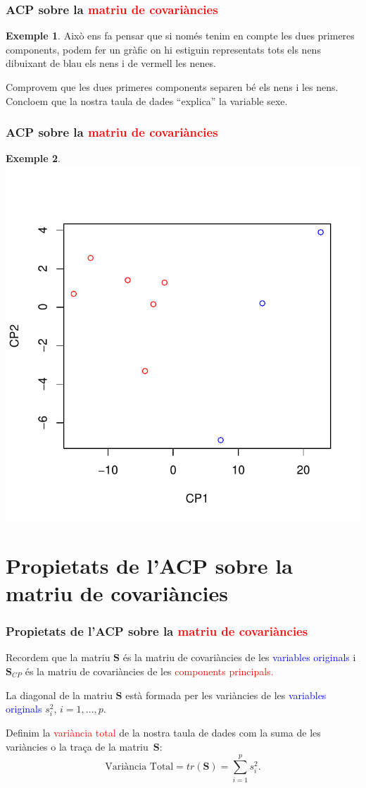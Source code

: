 \documentclass[12pt,t]{beamer}
\newcommand{\red}[1]{\textcolor{red}{#1}}
\newcommand{\blue}[1]{\textcolor{blue}{#1}}
\theoremstyle{plain}
\theoremstyle{definition}
\newtheorem{exemple}{Exemple}
\begin{document}
\begin{frame}
\frametitle{ACP sobre la \red{matriu de covariàncies}}
\begin{exemple}
Això ens fa pensar que si només tenim en compte les dues primeres components, podem fer un gràfic on hi estiguin representats tots els nens dibuixant de blau els nens i de vermell les nenes.
\medskip

Comprovem que les dues primeres components separen bé els nens i les nens. Concloem que la nostra taula de dades ``explica'' la variable sexe.
\end{exemple}
\end{frame}

\begin{frame}
\frametitle{ACP sobre la \red{matriu de covariàncies}}
\begin{exemple}
\vspace*{-1cm}

\includegraphics{ACP-030}
\end{exemple}
\end{frame}

\section{Propietats de l'ACP sobre la matriu de covariàncies}
\begin{frame}
\frametitle{Propietats de l'ACP sobre la \red{matriu de covariàncies}}
Recordem que la matriu $\mathbf{S}$ és la matriu de covariàncies de les \blue{variables originals} i $\mathbf{S}_{CP}$ és la matriu de covariàncies de les \red{components principals.}
\medskip

La diagonal de la matriu $\mathbf{S}$ està formada per les variàncies de les \blue{variables originals} $s_i^2$, $i=1,\ldots,p$.
\medskip

Definim la \red{variància total} de la nostra taula de dades com la suma de les variàncies o la traça de la matriu~$\mathbf{S}$:
\[
\mbox{Variància Total}=tr(\mathbf{S})=\sum_{i=1}^p s_i^2.
\]
\end{frame}
\end{document}
